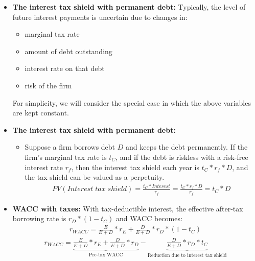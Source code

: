 \documentclass[ieeetran]{article}
\begin{document}
\begin{itemize}
\item \textbf{The interest tax shield with permanent debt:} Typically, the level of future interest payments is uncertain due to changes in:
	\begin{itemize}
	  \item marginal tax rate
\item amount of debt outstanding
	\item interest rate on that debt
	\item risk of the firm
	\end{itemize}
For simplicity, we will consider the special case in which the above variables are kept constant.

\item \textbf{The interest tax shield with permanent debt:}
	\begin{itemize}
		\item Suppose a firm borrows debt $D$ and keeps the debt permanently. If the firm's marginal tax rate is $t_C$, and if the debt is riskless with a risk-free interest rate $r_f$, then the interest tax shield each year is $t_C * r_f * D$, and the tax shield can be valued as a perpetuity.
			\large
			\begin{equation*}
			\boxed{
			\begin{aligned}
		PV(Interest \; tax \; shield) = \frac{t_C * Interest}{r_f} = \frac{t_C * r_f * D}{r_f} = t_C * D	
			\end{aligned}
			}
			\end{equation*}
			\normalsize
			
	\end{itemize}

\item \textbf{WACC with taxes:} With tax-deductible interest, the effective after-tax borrowing rate is $r_D * (1 - t_C)$ and WACC becomes:
	\large
	\begin{equation*}
	\boxed{
	\begin{aligned}
		r_{WACC} = \frac{E}{E + D} * r_E + \frac{D}{E + D} * r_D * (1 - t_C)
	\end{aligned}
	}
	\end{equation*}
	\normalsize
	\large
	\begin{equation*}
	\boxed{
	\begin{aligned}
r_{WACC} = \underbrace{\frac{E}{E + D} * r_E + \frac{D}{E + D} * r_D}_\text{Pre-tax WACC} - \underbrace{\frac{D}{E + D} * r_D * t_C}_\text{Reduction due to interest tax shield} 
	\end{aligned}
	}
	\end{equation*}
	\normalsize
	

\end{itemize}
\end{document}
